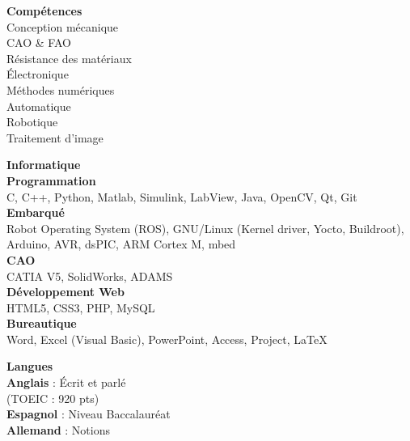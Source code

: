 \documentclass[a4paper,11pt,final]{memoir}
\newcommand{\SmallSep}{\vspace{0.5em}}
\newcommand{\SkillSection}[1]
	{\normalsize{\textbf{#1\\}}\normalfont\small}%
\newcommand{\SkillItem}[1]
{\vspace{0.25em}\textbf{\color{RoyalBlue} #1}\normalfont}
\begin{document}
\begin{flushleft}
\SkillSection{Compétences}
Conception mécanique\\
CAO \& FAO\\
Résistance des matériaux\\
Électronique\\
Méthodes numériques\\
Automatique\\
Robotique\\
Traitement d'image
\SmallSep

\SkillSection{Informatique}
\vspace{-0.25em}
\SkillItem{Programmation}\\
C, C++, Python, Matlab, Simulink, LabView, Java, OpenCV, Qt, Git\\ %
\SkillItem{Embarqué}\\
Robot Operating System (ROS), GNU/Linux (Kernel driver, Yocto, Buildroot), Arduino, AVR, dsPIC, ARM Cortex M, mbed\\%
\SkillItem{CAO}\\
CATIA V5, SolidWorks, ADAMS\\
\SkillItem{Développement Web}\\
HTML5, CSS3, PHP, MySQL\\
\SkillItem{Bureautique}\\
Word, Excel (Visual Basic), PowerPoint, Access, Project, \LaTeX
\SmallSep

\SkillSection{Langues}
\vspace{-0.25em}
\SkillItem{Anglais} : Écrit et parlé\\(TOEIC : 920 pts)\\
\SkillItem{Espagnol} : Niveau Baccalauréat\\
\SkillItem{Allemand} : Notions
\SmallSep


\end{flushleft}
\end{document}
